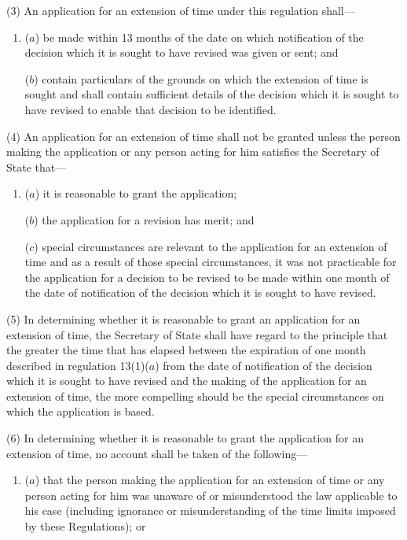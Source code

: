 \documentclass[12pt,a4paper]{article}
\begin{document}
{(3) An application for an extension of time under this regulation shall—
\begin{enumerate}\item[]
($a$) be made within 13 months of the date on which notification of the decision which it is sought to have revised was given or sent; and

($b$) contain particulars of the grounds on which the extension of time is sought and shall contain sufficient details of the decision which it is sought to have revised to enable that decision to be identified.
\end{enumerate}

(4) An application for an extension of time shall not be granted unless the person making the application or any person acting for him satisfies the Secretary of State that—
\begin{enumerate}\item[]
($a$) it is reasonable to grant the application;

($b$) the application for a revision has merit; and

($c$) special circumstances are relevant to the application for an extension of time and as a result of those special circumstances, it was not practicable for the application for a decision to be revised to be made within one month of the date of notification of the decision which it is sought to have revised.
\end{enumerate}

(5) In determining whether it is reasonable to grant an application for an extension of time, the Secretary of State shall have regard to the principle that the greater the time that has elapsed between the expiration of one month described in regulation 13(1)($a$) from the date of notification of the decision which it is sought to have revised and the making of the application for an extension of time, the more compelling should be the special circumstances on which the application is based.

(6) In determining whether it is reasonable to grant the application for an extension of time, no account shall be taken of the following—
\begin{enumerate}\item[]
($a$) that the person making the application for an extension of time or any person acting for him was unaware of or misunderstood the law applicable to his case (including ignorance or misunderstanding of the time limits imposed by these Regulations); or


\end{enumerate}}
\end{document}
